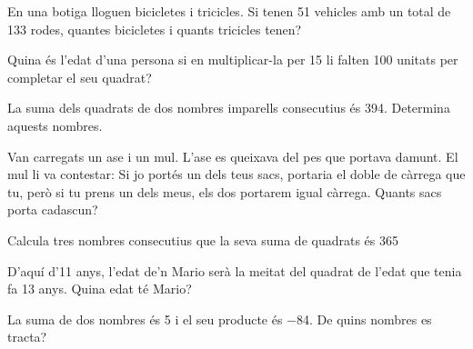 \begin{activitats}
\begin{mylist}
 
\exer  En una botiga lloguen bicicletes i tricicles. Si tenen 51 vehicles amb un total de 133 rodes, quantes bicicletes i quants tricicles tenen?

\exer  Quina és l'edat d'una persona si en multiplicar-la per 15 li falten 100 unitats per completar el seu quadrat?



\exer  La suma dels quadrats de dos nombres imparells consecutius és 394. Determina aquests nombres. 

\exer  Van carregats un ase i un mul. L'ase es queixava del pes que portava damunt. El mul li va contestar: Si jo portés un dels teus sacs, portaria el doble de càrrega que tu, però si tu prens un dels meus, els dos portarem igual càrrega. Quants sacs porta cadascun?


\exer  Calcula tres nombres consecutius que la seva suma de quadrats és 365

\exer  D'aquí d'11 anys, l'edat de'n Mario serà la meitat del quadrat de l'edat que tenia fa 13 anys. Quina edat té Mario?


\exer  La suma de dos nombres és 5 i el seu producte és $-$84. De quins nombres es tracta?


\end{mylist}
\end{activitats}
